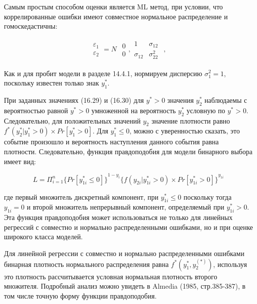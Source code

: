 Самым простым способом оценки является ML метод, при условии, что коррелированные ошибки имеют совместное нормальное распределение и гомоскедастичны:

\[
\begin{matrix}
\varepsilon_1\\ \varepsilon_2
\end{matrix}
=
N
\begin{matrix}
\begin{matrix}
0 \\ 0
\end{matrix},
\begin{matrix}
1 &\sigma_{12} \\ \sigma_{12}&\sigma_{22}^2
\end{matrix}
\end{matrix},
\]

Как и для пробит модели в разделе 14.4.1, нормируем дисперсию $\sigma^{2}_1=1$, поскольку известен только знак $y^{*}_1$. 

При заданных значениях (16.29) и (16.30) для $y^{*}>0$ значения $y^{*}_2$ наблюдаемы с вероятностью равной $y^{*}>0$ умноженной на вероятность $y^{*}_2$ условную по $y^{*}>0$. Следовательно, для положительных значений $y_2$ значение плотности равно $f^{*}(y^{*}_2|y^{*}_1>0){\times}Pr[y^{*}_1>0]$. Для $y^{*}_{1}{\leq}0$, можно с уверенностью сказать, это событие произошло и вероятность наступления данного события равна плотности. Следовательно, функция правдоподобия для модели бинарного выбора имеет вид:

\begin{equation}
L=\Pi_{i=1}^n{\lbrace Pr[y_{1i}^{*}{\leq}0]\rbrace}^{1-y_i}{\lbrace f(y_{2i}|y_{1i}^{*}>0){\times}Pr[y_{1i}^{*}>0]\rbrace}^{y_{1i}}
\end{equation}

где первый множитель дискретный компонент, при $y^{*}_{1i}{\leq}0$ поскольку тогда $y_{1i}=0$ и второй множитель непрерывный компонент, определяемый при $y^{*}_{1i}>0$. Эта функция правдоподобия может использоваться не только для линейных регрессий с совместно и нормально распределенными ошибками, но и при оценке широкого класса моделей.

Для линейной регрессии с совместно и нормально распределенными ошибками бинарная плотность нормального распределения равна $f^{*}(y^{*}_1,y^(*)_2)$, используя это плотность рассчитывается условная нормальная плотность второго множителя. Подробный анализ можно увидеть в Almedia (1985, стр.385-387), в том числе точную форму функции правдоподобия. 

